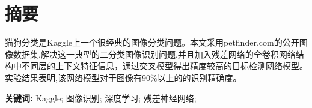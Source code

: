 \chapter{摘要}

猫狗分类是Kaggle上一个很经典的图像分类问题。本文采用petfinder.com的公开图像数据集,解决这一典型的二分类图像识别问题.并且加入残差网络的全卷积网络结构中不同层的上下文特征信息，通过交叉模型得出精度较高的目标检测网络模型。实验结果表明,该网络模型对于图像有90\%以上的的识别精确度。
\par
\par
{
    \vspace{1em}
    \setlength{\parindent}{0em}
    \par
    \par
    \textbf{关键词:} \; Kaggle; \; 图像识别; \; 深度学习; \; 残差神经网络; \par
}
